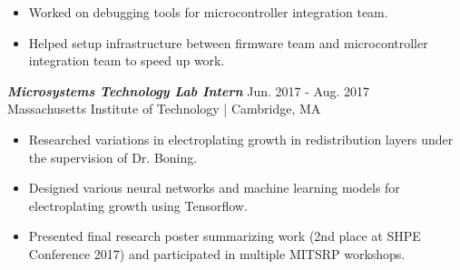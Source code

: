 \documentclass[letter]{res}
\begin{document}
\begin{resume}
 \begin{itemize}
 \item Worked on debugging tools for microcontroller integration team.
 \item Helped setup infrastructure between firmware team and microcontroller integration team to speed up work.
 \end{itemize}

\vspace{-2mm}

{\sl \textbf{Microsystems Technology Lab Intern}} \hfill Jun. 2017 - Aug. 2017\\
Massachusetts Institute of Technology | Cambridge, MA \newline

 \vspace{-4mm}

 \begin{itemize}
 \item Researched variations in electroplating growth in redistribution layers under the supervision of Dr. Boning.
 \item Designed various neural networks and machine learning models for electroplating growth using Tensorflow.
 \item Presented final research poster summarizing work (2nd place at SHPE Conference 2017) and participated in multiple MITSRP workshops.
 \end{itemize}

\vspace{-2mm}

%
%
%

%
%
%


\end{resume}
\end{document}

